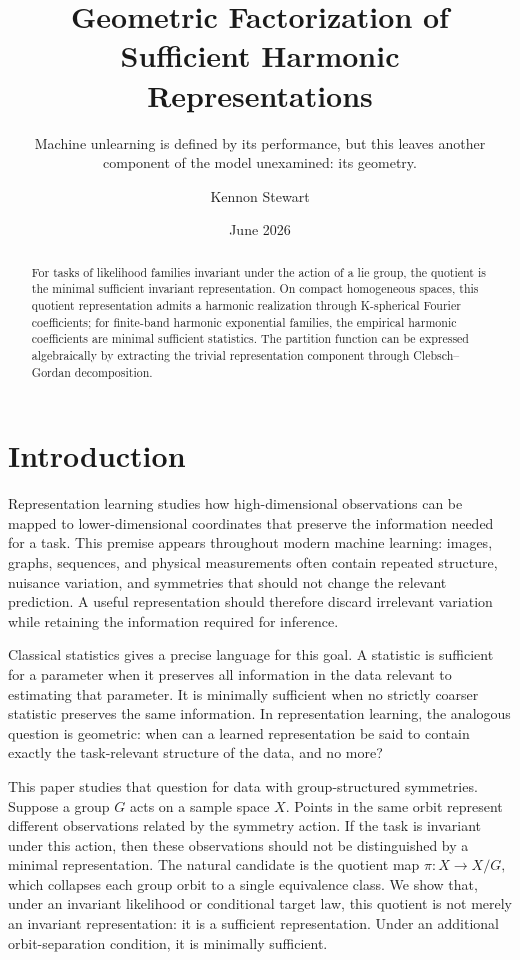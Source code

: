 \documentclass{ssl}
\title{Geometric Factorization of Sufficient Harmonic Representations}
\subtitle{Machine unlearning is defined by its performance, but this leaves another component of the model unexamined: its geometry.}
\author{Kennon Stewart\affilnum{1,2}}
\affiliation{\affilnum{1} Second Street Labs, Detroit, MI, USA\\
\affilnum{2} Department of Statistics, University of Michigan, Ann Arbor, MI, USA}
\date{June 2026}
\begin{document}
\begin{abstract}
For tasks of likelihood families invariant under the action of a lie group, the quotient is the minimal sufficient invariant representation. On compact homogeneous spaces, this quotient representation admits a harmonic realization through K-spherical Fourier coefficients; for finite-band harmonic exponential families, the empirical harmonic coefficients are minimal sufficient statistics. The partition function can be expressed algebraically by extracting the trivial representation component through Clebsch–Gordan decomposition.
\end{abstract}
\maketitle


\section{Introduction}

Representation learning studies how high-dimensional observations can be mapped to lower-dimensional coordinates that preserve the information needed for a task. This premise appears throughout modern machine learning: images, graphs, sequences, and physical measurements often contain repeated structure, nuisance variation, and symmetries that should not change the relevant prediction. A useful representation should therefore discard irrelevant variation while retaining the information required for inference.

Classical statistics gives a precise language for this goal. A statistic is sufficient for a parameter when it preserves all information in the data relevant to estimating that parameter. It is minimally sufficient when no strictly coarser statistic preserves the same information. In representation learning, the analogous question is geometric: when can a learned representation be said to contain exactly the task-relevant structure of the data, and no more?

This paper studies that question for data with group-structured symmetries. Suppose a group $G$ acts on a sample space $X$. Points in the same orbit represent different observations related by the symmetry action. If the task is invariant under this action, then these observations should not be distinguished by a minimal representation. The natural candidate is the quotient map $\pi:X\to X/G,$ which collapses each group orbit to a single equivalence class. We show that, under an invariant likelihood or conditional target law, this quotient is not merely an invariant representation: it is a sufficient representation. Under an additional orbit-separation condition, it is minimally sufficient.
\end{document}
